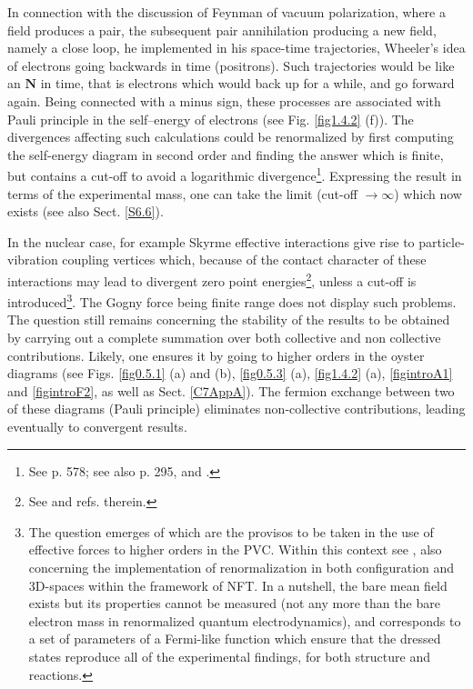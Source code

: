 \begin{subappendices}
 In connection with the discussion of Feynman of vacuum polarization, where a field produces a pair,
 the subsequent pair annihilation producing a new field, namely a close loop, he implemented in his space-time trajectories, 
 Wheeler's idea of electrons going backwards in time (positrons).  Such trajectories would be like an $\mathbf N$ in time,
 that is electrons which would back up for a while, and go forward again. Being connected 
 with a minus sign, these processes are associated with Pauli principle in the self--energy of electrons
 (see Fig. \ref{fig1.4.2} (f)). 
 The divergences affecting
 such calculations  could be renormalized by first computing the self-energy  diagram in second order and finding the answer which is finite, but contains a cut-off
 to avoid a logarithmic divergence\footnote{See \cite{Bethe:47,Feynman:61b,Weinberg:96} p. 578; see also \cite{Mehra:96} p. 295, and \cite{Bjorken:98}.}. Expressing the result in terms of the experimental mass, one can take 
 the limit (cut-off $\to \infty$) which now exists (see also Sect. \ref{S6.6}).
  
 In the nuclear case, for example Skyrme effective interactions give 
 rise to particle-vibration coupling vertices which, because of the contact character of these interactions 
 may lead to divergent zero point energies\footnote{See \cite{Hellemans:13,Pastore:15} and refs. therein.}, unless a cut-off is introduced\footnote{The question emerges of which are the provisos to be taken in the use of effective forces to higher orders in the PVC. Within this context see \cite{Mahaux:85}, also \cite{Broglia:16,Barranco:17} concerning the implementation of renormalization in both configuration and 3D-spaces within the framework of NFT. In a nutshell, the bare mean field exists but its properties cannot be measured (not any more than the bare electron mass in renormalized quantum electrodynamics), and corresponds to a set of parameters of a Fermi-like function which ensure that the dressed states reproduce all of the experimental findings, for both structure and reactions.}.
 The Gogny force being finite range does not display such problems. The question still remains concerning the stability of the results to be obtained by carrying out a complete summation over both collective and non collective contributions. 
 Likely, one ensures it   by going to higher orders in the oyster diagrams (see Figs. \ref{fig0.5.1} (a) and (b), \ref{fig0.5.3} (a),  \ref{fig1.4.2} (a), \ref{figintroA1} and \ref{figintroF2}, as well as Sect. \ref{C7AppA}). 
 The fermion exchange between two of these diagrams (Pauli principle)  eliminates  non-collective
 contributions, leading eventually to convergent results.
 
 
 
 


\end{subappendices}



